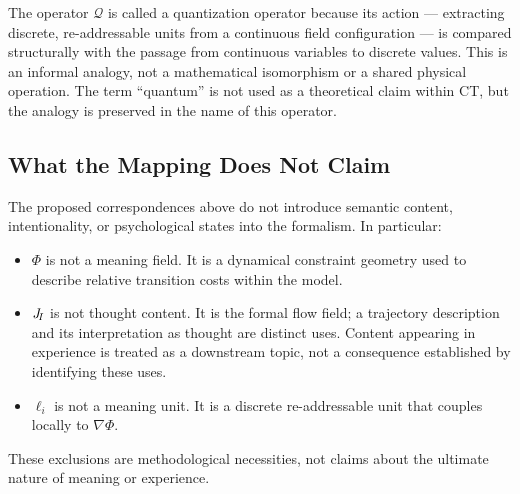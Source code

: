 \begin{remark}
The operator $\mathcal{Q}$ is called a quantization operator because its
action --- extracting discrete, re-addressable units from a continuous
field configuration --- is compared structurally with the passage from
continuous variables to discrete values. This is an informal analogy,
not a mathematical isomorphism or a shared physical operation.
The term ``quantum'' is not used as a theoretical claim within CT, but
the analogy is preserved in the name of this operator.
\end{remark}

\subsection{What the Mapping Does Not Claim}

The proposed correspondences above do not introduce semantic content,
intentionality, or psychological states into the formalism.
In particular:
\begin{itemize}
  \item $\Phi$ is not a meaning field. It is a dynamical constraint
        geometry used to describe relative transition costs within the model.
  \item $J_{\!I}$ is not thought content. It is the formal flow field; a trajectory
        description and its interpretation as thought are distinct uses.
        Content appearing in experience is treated as a downstream topic,
        not a consequence established by identifying these uses.
  \item $\ell_i$ is not a meaning unit. It is a discrete re-addressable
        unit that couples locally to $\nabla\Phi$.
\end{itemize}
These exclusions are methodological necessities, not claims about the
ultimate nature of meaning or experience.
